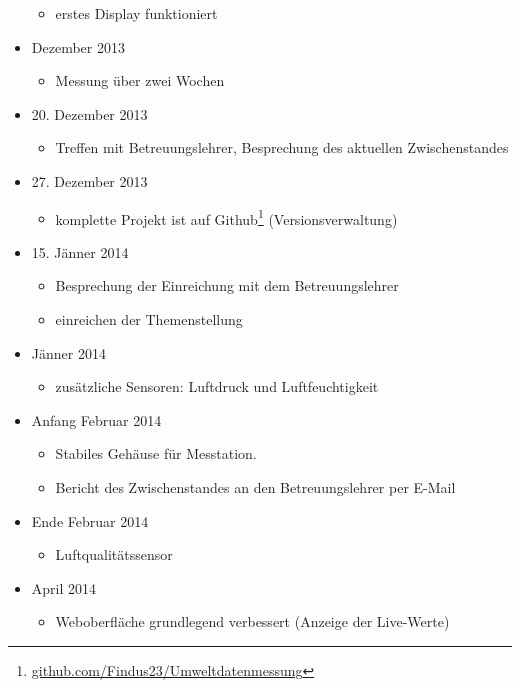 \documentclass[12pt,a4paper,oneside]{scrartcl}
\begin{document}
\begin{multicols}{2}
\begin{itemize}
	\begin{itemize}
		\item erstes Display funktioniert
	\end{itemize}
	\item Dezember 2013
	\begin{itemize}
		\item Messung über zwei Wochen
	\end{itemize}
	\item 20. Dezember 2013
	\begin{itemize}
		\item Treffen mit Betreuungslehrer, Besprechung des aktuellen Zwischenstandes
	\end{itemize}
	\item 27. Dezember 2013
	\begin{itemize}
		\item komplette Projekt ist auf Github\footnote{\href{https://github.com/Findus23/Umweltdatenmessung}{github.com/Findus23/Umweltdatenmessung}} (Versionsverwaltung)
	\end{itemize}
	\item 15. Jänner 2014
	\begin{itemize}
		\item Besprechung der Einreichung mit dem Betreuungslehrer
		\item einreichen der Themenstellung
	\end{itemize}
	\item Jänner 2014
	\begin{itemize}
		\item zusätzliche Sensoren: Luftdruck und Luftfeuchtigkeit
	\end{itemize}
	\item Anfang Februar 2014
	\begin{itemize}
		\item Stabiles Gehäuse für Messtation.
		\item Bericht des Zwischenstandes an den Betreuungslehrer per E-Mail
	\end{itemize}
	\item Ende Februar 2014
	\begin{itemize}
		\item Luftqualitätssensor
	\end{itemize}
	\item April 2014
	\begin{itemize}
		\item Weboberfläche grundlegend verbessert (Anzeige der Live-Werte)
	\end{itemize}

\end{itemize}
\end{multicols}
\end{document}
